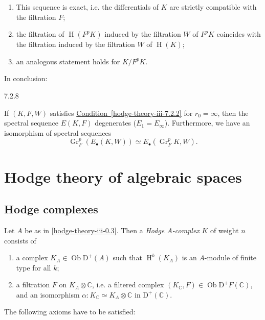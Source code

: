     
 \begin{enumerate}
      
 \item[(a)]
        This sequence is exact, i.e. the differentials of \(K\) are strictly compatible with the filtration \(F\);
      


      
 \item[(b)]
        the filtration of \(\operatorname {H}(F^pK)\) induced by the filtration \(W\) of \(F^pK\) coincides with the filtration induced by the filtration \(W\) of \(\operatorname {H}(K)\);
      


      
 \item[(c)]
        an analogous statement holds for \(K/F^pK\).
      

    \end{enumerate}\par{}In conclusion:\begin{proposition}{7.2.8}\label{hodge-theory-iii-7.2.8}\skipsinglepar\par{}If \((K,F,W)\) satisfies \hyperref[hodge-theory-iii-7.2.2]{Condition~\ref*{hodge-theory-iii-7.2.2}} for \(r_0=\infty \), then the spectral sequence \(E(K,F)\) degenerates (\(E_1=E_\infty \)).
    Furthermore, we have an isomorphism of spectral sequences
    \[       \operatorname {Gr}_F^p(E_\bullet (K,W))       \simeq  E_\bullet (\operatorname {Gr}_F^pK,W).     \]\end{proposition}\chapter{Hodge theory of algebraic spaces}\thispagestyle{fancy}\label{hodge-theory-iii-8}\section{Hodge complexes}\label{hodge-theory-iii-8.1}\label{hodge-theory-iii-8.1.1}\par{}Let \(A\) be as in \cref{hodge-theory-iii-0.3}.
    Then a \emph{Hodge \(A\)-complex} \(K\) of weight \(n\) consists of

    
 \begin{enumerate}
      
 \item[(𝛼)]
        a complex \(K_A\in \operatorname {Ob}\mathrm {D}^+(A)\) such that \(\operatorname {H}^k(K_A)\) is an \(A\)-module of finite type for all \(k\);
      


      
 \item[(𝛽)]
        a filtration \(F\) on \(K_A\otimes \mathbb {C}\), i.e. a filtered complex \((K_\mathbb {C},F)\in \operatorname {Ob}\mathrm {D}^+F(\mathbb {C})\), and an isomorphism \(\alpha \colon  K_\mathbb {C}\simeq  K_A\otimes \mathbb {C}\) in \(\mathrm {D}^+(\mathbb {C})\).
      

    \end{enumerate}\par{}The following axioms have to be satisfied:

